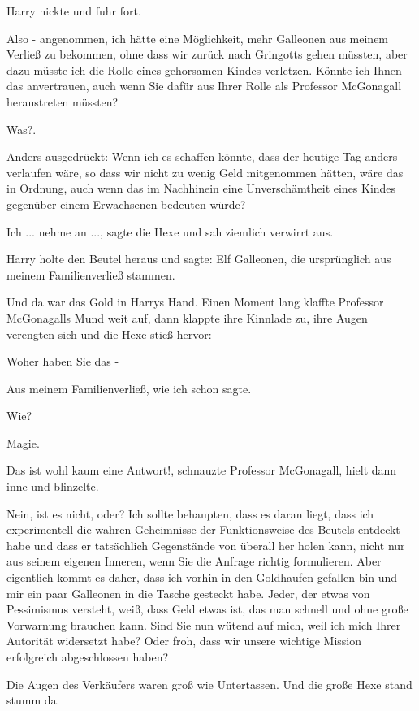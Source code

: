 Harry nickte und fuhr fort.

\glqq{}Also - angenommen, ich hätte eine Möglichkeit, mehr Galleonen aus meinem
Verließ zu bekommen, ohne dass wir zurück nach Gringotts gehen müssten, aber
dazu müsste ich die Rolle eines gehorsamen Kindes verletzen. Könnte ich Ihnen
das anvertrauen, auch wenn Sie dafür aus Ihrer Rolle als Professor McGonagall
heraustreten müssten?\grqq{}

\glqq{}Was?\grqq{}.

\glqq{}Anders ausgedrückt: Wenn ich es schaffen könnte, dass der heutige Tag
anders verlaufen wäre, so dass wir nicht zu wenig Geld mitgenommen hätten, wäre
das in Ordnung, auch wenn das im Nachhinein eine Unverschämtheit eines Kindes
gegenüber einem Erwachsenen bedeuten würde?\grqq{}

\glqq{}Ich ... nehme an ...\grqq{}, sagte die Hexe und sah ziemlich verwirrt aus.

Harry holte den Beutel heraus und sagte: \glqq{}Elf Galleonen, die ursprünglich
aus meinem Familienverließ stammen.\grqq{}

Und da war das Gold in Harrys Hand. Einen Moment lang klaffte Professor
McGonagalls Mund weit auf, dann klappte ihre Kinnlade zu, ihre Augen verengten
sich und die Hexe stieß hervor:

\glqq{}Woher haben Sie das -\grqq{}

\glqq{}Aus meinem Familienverließ, wie ich schon sagte.\grqq{}

\glqq{}Wie?\grqq{}

\glqq{}Magie.\grqq{}

\glqq{}Das ist wohl kaum eine Antwort!\grqq{}, schnauzte Professor McGonagall,
hielt dann inne und blinzelte.

\glqq{}Nein, ist es nicht, oder? Ich sollte behaupten, dass es daran liegt, dass
ich experimentell die wahren Geheimnisse der Funktionsweise des Beutels entdeckt
habe und dass er tatsächlich Gegenstände von überall her holen kann, nicht nur
aus seinem eigenen Inneren, wenn Sie die Anfrage richtig formulieren. Aber
eigentlich kommt es daher, dass ich vorhin in den Goldhaufen gefallen bin und
mir ein paar Galleonen in die Tasche gesteckt habe. Jeder, der etwas von
Pessimismus versteht, weiß, dass Geld etwas ist, das man schnell und ohne große
Vorwarnung brauchen kann. Sind Sie nun wütend auf mich, weil ich mich Ihrer
Autorität widersetzt habe? Oder froh, dass wir unsere wichtige Mission
erfolgreich abgeschlossen haben?\grqq{}

Die Augen des Verkäufers waren groß wie Untertassen. Und die große Hexe stand
stumm da.

